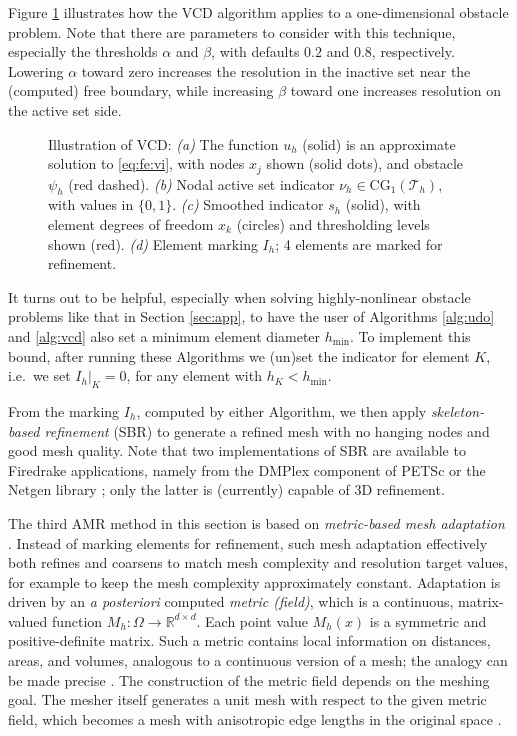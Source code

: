 \documentclass[]{interact}
\theoremstyle{plain}%
\theoremstyle{definition}
\theoremstyle{remark}
\newcommand{\RR}{\mathbb{R}}
\newcommand{\cT}{\mathcal{T}}
\newcommand{\CG}{\text{CG}}
\begin{document}
Figure \ref{fig:vcdillustration} illustrates how the VCD algorithm applies to a one-dimensional obstacle problem.  Note that there are parameters to consider with this technique, especially the thresholds $\alpha$ and $\beta$, with defaults $0.2$ and $0.8$, respectively.  Lowering $\alpha$ toward zero increases the resolution in the inactive set near the (computed) free boundary, while increasing $\beta$ toward one increases resolution on the active set side.

\begin{figure}[ht]

\caption{Illustration of VCD: \emph{(a)} The function $u_h$ (solid) is an approximate solution to \eqref{eq:fe:vi}, with nodes $x_j$ shown (solid dots), and obstacle $\psi_h$ (red dashed).  \emph{(b)} Nodal active set indicator $\nu_h \in \CG_1(\cT_h)$, with values in $\{0,1\}$.  \emph{(c)} Smoothed indicator $s_h$ (solid), with element degrees of freedom $x_k$ (circles) and thresholding levels shown (red).  \emph{(d)} Element marking $I_h$; 4 elements are marked for refinement.}
\label{fig:vcdillustration}
\end{figure}

\newcommand{\hmin}{h_{\min}}

It turns out to be helpful, especially when solving highly-nonlinear obstacle problems like that in Section \ref{sec:app}, to have the user of Algorithms \ref{alg:udo} and \ref{alg:vcd} also set a minimum element diameter $\hmin$.  To implement this bound, after running these Algorithms we (un)set the indicator for element $K$, i.e.~we set $I_h|_K=0$, for any element with $h_K < \hmin$.

From the marking $I_h$, computed by either Algorithm, we then apply \emph{skeleton-based refinement} (SBR) \cite{PlazaCarey2000} to generate a refined mesh with no hanging nodes and good mesh quality.  Note that two implementations of SBR are available to Firedrake applications, namely from the DMPlex component of PETSc \cite{petsc-user-ref} or the Netgen library \cite{Betteridgeetal2024}; only the latter is (currently) capable of 3D refinement.

The third AMR method in this section is based on \emph{metric-based mesh adaptation} \cite{Alauzet2010}.  Instead of marking elements for refinement, such mesh adaptation effectively both refines and coarsens to match mesh complexity and resolution target values, for example to keep the mesh complexity approximately constant.  Adaptation is driven by an \emph{a posteriori} computed \emph{metric (ﬁeld)}, which is a continuous, matrix-valued function $M_h:\Omega \to \RR^{d\times d}$.  Each point value $M_h(x)$ is a symmetric and positive-definite matrix.  Such a metric contains local information on distances, areas, and volumes, analogous to a continuous version of a mesh; the analogy can be made precise \cite{LoseilleAlauzet2011}.  The construction of the metric field depends on the meshing goal.  The mesher itself generates a unit mesh with respect to the given metric field, which becomes a mesh with anisotropic edge lengths in the original space \cite{Wallworketal2020}.
\end{document}
